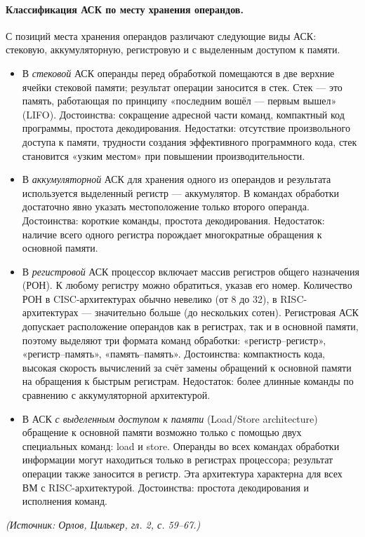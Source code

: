 \documentclass[a4paper,12pt]{article}
\begin{document}
\paragraph{Классификация АСК по месту хранения операндов.}
С позиций места хранения операндов различают следующие виды АСК: стековую, аккумуляторную, регистровую и с выделенным доступом к памяти.
\begin{itemize}
\item В \emph{стековой} АСК операнды перед обработкой помещаются в две верхние ячейки стековой памяти; результат операции заносится в стек. Стек --- это память, работающая по принципу «последним вошёл --- первым вышел» (LIFO). Достоинства: сокращение адресной части команд, компактный код программы, простота декодирования. Недостатки: отсутствие произвольного доступа к памяти, трудности создания эффективного программного кода, стек становится «узким местом» при повышении производительности.
\item В \emph{аккумуляторной} АСК для хранения одного из операндов и результата используется выделенный регистр --- аккумулятор. В командах обработки достаточно явно указать местоположение только второго операнда. Достоинства: короткие команды, простота декодирования. Недостаток: наличие всего одного регистра порождает многократные обращения к основной памяти.
\item В \emph{регистровой} АСК процессор включает массив регистров общего назначения (РОН). К любому регистру можно обратиться, указав его номер. Количество РОН в CISC-архитектурах обычно невелико (от 8 до 32), в RISC-архитектурах --- значительно больше (до нескольких сотен). Регистровая АСК допускает расположение операндов как в регистрах, так и в основной памяти, поэтому выделяют три формата команд обработки: «регистр--регистр», «регистр--память», «память--память». Достоинства: компактность кода, высокая скорость вычислений за счёт замены обращений к основной памяти на обращения к быстрым регистрам. Недостаток: более длинные команды по сравнению с аккумуляторной архитектурой.
\item В АСК \emph{с выделенным доступом к памяти} (Load/Store architecture) обращение к основной памяти возможно только с помощью двух специальных команд: load и store. Операнды во всех командах обработки информации могут находиться только в регистрах процессора; результат операции также заносится в регистр. Эта архитектура характерна для всех ВМ с RISC-архитектурой. Достоинства: простота декодирования и исполнения команд.
\end{itemize}
\textit{(Источник: Орлов, Цилькер, гл. 2, с. 59--67.)}
\end{document}
